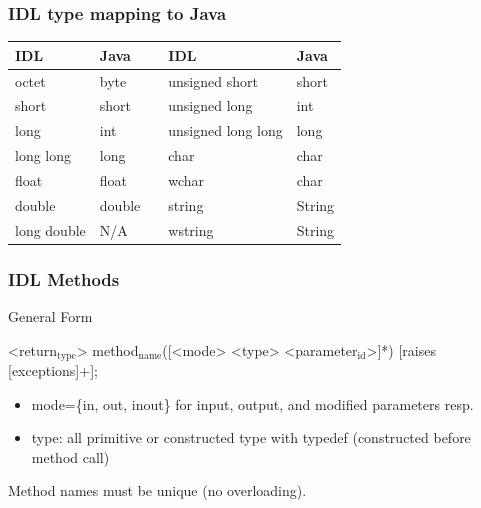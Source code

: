 \documentclass[bigger,hyperref={colorlinks=true, urlcolor=red, plainpages=false, pdfpagelabels, bookmarksnumbered}]{beamer}
\begin{document}
\begin{frame}
\frametitle{IDL type mapping to Java}
\label{sec-4-6}



\begin{center}
\begin{tabular}{lllll}
 IDL          &  Java    &     &  IDL                 &  Java    \\
\hline
 octet        &  byte    &     &  unsigned short      &  short   \\
 short        &  short   &     &  unsigned long       &  int     \\
 long         &  int     &     &  unsigned long long  &  long    \\
 long long    &  long    &     &  char                &  char    \\
 float        &  float   &     &  wchar               &  char    \\
 double       &  double  &     &  string              &  String  \\
 long double  &  N/A     &     &  wstring             &  String  \\
\end{tabular}
\end{center}
\end{frame}
\begin{frame}
\frametitle{IDL Methods}
\label{sec-4-7}
\begin{block}{General Form}
\label{sec-4-7-1}

<return$_{\mathrm{type}}$> method$_{\mathrm{name}}$([<mode> <type> <parameter$_{\mathrm{id}}$>]*) [raises [exceptions]+]; 

\begin{itemize}
\item mode=\{in, out, inout\} for input, output, and modified parameters resp.
\item type: all primitive or constructed type with typedef (constructed before method call)
\end{itemize}

Method names must be unique (no overloading).
\end{block}
\end{frame}
\end{document}
